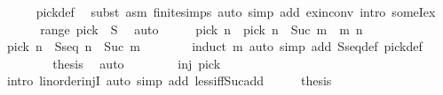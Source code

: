 \begin{isabellebody}
\ \ \ \ \isamarkupfalse%
\ pick{\isacharunderscore}{\kern0pt}def\ \isamarkupfalse%
\ {\isacharparenleft}{\kern0pt}subst\ {\isacharparenleft}{\kern0pt}asm{\isacharparenright}{\kern0pt}\ finite{\isachardot}{\kern0pt}simps{\isacharparenright}{\kern0pt}\ {\isacharparenleft}{\kern0pt}auto\ simp\ add{\isacharcolon}{\kern0pt}\ ex{\isacharunderscore}{\kern0pt}in{\isacharunderscore}{\kern0pt}conv\ intro{\isacharcolon}{\kern0pt}\ someI{\isacharunderscore}{\kern0pt}ex{\isacharparenright}{\kern0pt}\isanewline
\ \ \isamarkupfalse%
\ {\isacharasterisk}{\kern0pt}\ \isamarkupfalse%
\ {\isachardoublequoteopen}range\ pick\ {\isasymsubseteq}\ S{\isachardoublequoteclose}\ \isamarkupfalse%
\ auto\isanewline
\ \ \isamarkupfalse%
\ \isamarkupfalse%
\ {\isachardoublequoteopen}pick\ n\ {\isasymnoteq}\ pick\ {\isacharparenleft}{\kern0pt}n\ {\isacharplus}{\kern0pt}\ Suc\ m{\isacharparenright}{\kern0pt}{\isachardoublequoteclose}\ \ m\ n\isanewline
\ \ \isamarkupfalse%
\ {\isacharminus}{\kern0pt}\isanewline
\ \ \ \ \isamarkupfalse%
\ {\isachardoublequoteopen}pick\ n\ {\isasymnotin}\ Sseq\ {\isacharparenleft}{\kern0pt}n\ {\isacharplus}{\kern0pt}\ Suc\ m{\isacharparenright}{\kern0pt}{\isachardoublequoteclose}\isanewline
\ \ \ \ \ \ \isamarkupfalse%
\ {\isacharparenleft}{\kern0pt}induct\ m{\isacharparenright}{\kern0pt}\ {\isacharparenleft}{\kern0pt}auto\ simp\ add{\isacharcolon}{\kern0pt}\ Sseq{\isacharunderscore}{\kern0pt}def\ pick{\isacharunderscore}{\kern0pt}def{\isacharparenright}{\kern0pt}\isanewline
\ \ \ \ \isamarkupfalse%
\ {\isacharasterisk}{\kern0pt}{\isacharasterisk}{\kern0pt}\ \isamarkupfalse%
\ {\isacharquery}{\kern0pt}thesis\ \isamarkupfalse%
\ auto\isanewline
\ \ \isamarkupfalse%
\isanewline
\ \ \isamarkupfalse%
\ \isamarkupfalse%
\ {\isachardoublequoteopen}inj\ pick{\isachardoublequoteclose}\isanewline
\ \ \ \ \isamarkupfalse%
\ {\isacharparenleft}{\kern0pt}intro\ linorder{\isacharunderscore}{\kern0pt}injI{\isacharparenright}{\kern0pt}\ {\isacharparenleft}{\kern0pt}auto\ simp\ add{\isacharcolon}{\kern0pt}\ less{\isacharunderscore}{\kern0pt}iff{\isacharunderscore}{\kern0pt}Suc{\isacharunderscore}{\kern0pt}add{\isacharparenright}{\kern0pt}\isanewline
\ \ \isamarkupfalse%
\ \isamarkupfalse%
\ {\isacharquery}{\kern0pt}thesis\ \isamarkupfalse%

\end{isabellebody}

